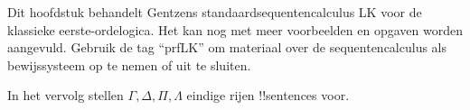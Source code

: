 \documentclass[openany]{memoir}
\begin{document}
\begingroup
\def\olfilename{OLP-0069}
\def\olfilepath{content/first-order-logic/sequent-calculus/}
\hypertarget{unit-OLP-0069}{}



      {}
      {}

\begin{editorial}
  Dit hoofdstuk behandelt Gentzens standaardsequentencalculus LK voor
  de klassieke eerste-ordelogica. Het kan nog met meer voorbeelden en
  opgaven worden aangevuld. Gebruik de tag ``prfLK'' om materiaal over
  de sequentencalculus als bewijssysteem op te nemen of uit te sluiten.
\end{editorial}













\endgroup

\begingroup
\def\olfilename{OLP-0070}
\def\olfilepath{content/first-order-logic/sequent-calculus/}
\hypertarget{unit-OLP-0070}{}



      {}
      {}


In het vervolg stellen $\Gamma, \Delta, \Pi, \Lambda$ eindige rijen
!!{sentence}s voor.
\end{document}
